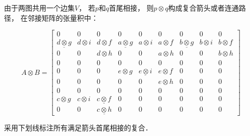 \documentclass[10pt, openany]{book}
\begin{document}
由于两图共用一个边集$V$，
若$p$和$q$首尾相接，
则$p \otimes q$构成复合箭头或者连通路径，
在邻接矩阵的张量积中：

\begin{equation}
A \otimes B = 
\left[ \begin{array}{ccc|ccc|ccc}
0 & 0 & 0 & 0 & 0 & 0 & 0 & 0 & 0 \\
\underline{d \otimes g} & d \otimes i & d \otimes f & \underline{a \otimes g} & a \otimes i & a \otimes f & \underline{b \otimes g} & b \otimes i & b \otimes f \\
0 & 0 & d \otimes h & 0 & 0 & a \otimes h & 0 & 0 & b \otimes h \\ \hline
0 & 0 & 0 & 0 & 0 & 0 & 0 & 0 & 0 \\
0 & 0 & 0 & e \otimes g & \underline{e \otimes i} & e \otimes f & 0 & 0 & 0 \\
0 & 0 & 0 & 0 & 0 & e \otimes h & 0 & 0 & 0 \\ \hline
0 & 0 & 0 & 0 & 0 & 0 & 0 & 0 & 0 \\
c \otimes g & c \otimes i & \underline{c \otimes f} & 0 & 0 & 0 & 0 & 0 & 0 \\
0 & 0 & \underline{c \otimes h} & 0 & 0 & 0 & 0 & 0 & 0 
\end{array} \right]
\end{equation}

采用下划线标注所有满足箭头首尾相接的复合．
\end{document}
